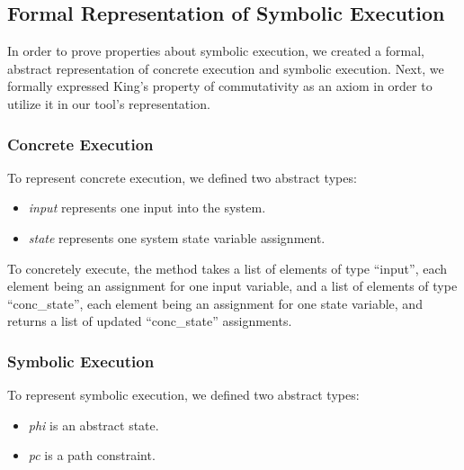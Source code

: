 \subsection{Formal Representation of Symbolic Execution}
In order to prove properties about symbolic execution, we created a formal, abstract representation of concrete execution and symbolic execution.
Next, we formally expressed King's property of commutativity as an axiom in order to utilize it in our tool's representation.

\subsubsection{Concrete Execution}
To represent concrete execution, we defined two abstract types: 
\begin{itemize}
\item \textit{input} represents one input into the system.
\item \textit{state}  represents one system state variable assignment.
\end{itemize}

To concretely execute, the method takes a list of elements of type ``input'', each element being an assignment for one input variable, and a list of elements of type ``conc\_state'', each element being an assignment for one state variable,
and returns a list of updated  ``conc\_state'' assignments.




\subsubsection{Symbolic Execution}

To represent symbolic execution, we defined two abstract types:
\begin{itemize}
\item \textit{phi} is an abstract state.
\item \textit{pc} is a path constraint.
\end{itemize}

